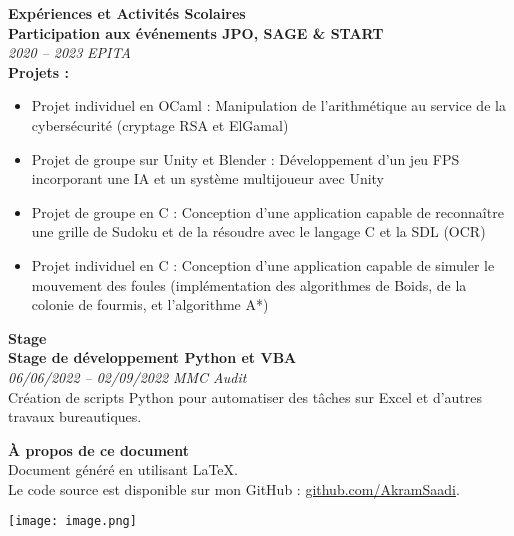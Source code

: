 \documentclass[a4paper,11pt]{article}
\newcommand{\cvsection}[1]{\vspace{1em}\noindent\textbf{\textcolor{cvhighlight}{\LARGE #1}}\vspace{0.5em}\\}
\newcommand{\cvevent}[3]{\textbf{#1} \\ \textit{#2} \hfill \textit{#3} \vspace{0.5em}}
\newcommand{\cvitem}[1]{\item #1}
\begin{document}
\begin{paracol}{2}
\colorbox{sectionbg1}{
    \parbox{\linewidth}{
        \cvsection{\faBriefcase \hspace{0.5em} Expériences et Activités Scolaires}
        \cvevent{Participation aux événements JPO, SAGE \& START}{2020 – 2023}{EPITA} \\
        \textbf{Projets :}
        \begin{itemize}[leftmargin=0.5cm, itemsep=0pt, topsep=0pt]
            \cvitem{Projet individuel en OCaml : Manipulation de l'arithmétique au service de la cybersécurité (cryptage RSA et ElGamal)}
            \cvitem{Projet de groupe sur Unity et Blender : Développement d'un jeu FPS incorporant une IA et un système multijoueur avec Unity}
            \cvitem{Projet de groupe en C : Conception d'une application capable de reconnaître une grille de Sudoku et de la résoudre avec le langage C et la SDL (OCR)}
            \cvitem{Projet individuel en C : Conception d'une application capable de simuler le mouvement des foules (implémentation des algorithmes de Boids, de la colonie de fourmis, et l'algorithme A*)}
        \end{itemize}
    }
}
\medskip

\colorbox{sectionbg2}{
    \parbox{\linewidth}{
        \cvsection{\faLaptopCode \hspace{0.5em} Stage}
        \cvevent{Stage de développement Python et VBA}{06/06/2022 – 02/09/2022}{MMC Audit} \\
        Création de scripts Python pour automatiser des tâches sur Excel et d'autres travaux bureautiques.
    }
}
\medskip

\colorbox{sectionbg1}{
    \parbox{\linewidth}{
        \cvsection{\faFileCode \hspace{0.5em} À propos de ce document}
        Document généré en utilisant \LaTeX. \\
        Le code source est disponible sur mon GitHub : \href{https://github.com/AkramSaadi}{github.com/AkramSaadi}.
    }
}
\medskip

\begin{minipage}[t]{\linewidth}
    \vfill
    \hfill
    \texttt{[image: image.png]}
\end{minipage}

\end{paracol}
\end{document}
